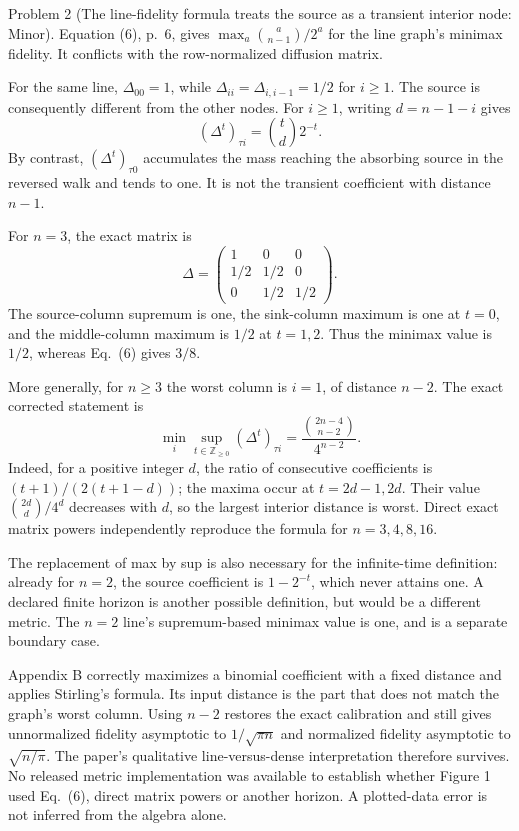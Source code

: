\documentclass[10pt]{article}
\begin{document}
Problem 2 (The line-fidelity formula treats the source as a transient interior node: Minor).  Equation (6), p. 6, gives \(\max_a\binom{a}{n-1}/2^a\) for the line graph’s minimax fidelity. It conflicts with the row-normalized diffusion matrix.\par
For the same line, \(\Delta_{00}=1\), while \(\Delta_{ii}=\Delta_{i,i-1}=1/2\) for \(i\ge1\). The source is consequently different from the other nodes. For \(i\ge1\), writing \(d=n-1-i\) gives \[(\Delta^t)_{\tau i}=\binom td2^{-t}.\] By contrast, \((\Delta^t)_{\tau0}\) accumulates the mass reaching the absorbing source in the reversed walk and tends to one. It is not the transient coefficient with distance \(n-1\).\par
For \(n=3\), the exact matrix is \[\Delta=\begin{pmatrix}1&0&0\\[1pt]1/2&1/2&0\\[1pt]0&1/2&1/2\end{pmatrix}.\] The source-column supremum is one, the sink-column maximum is one at \(t=0\), and the middle-column maximum is \(1/2\) at \(t=1,2\). Thus the minimax value is \(1/2\), whereas Eq. (6) gives \(3/8\).\par
More generally, for \(n\ge3\) the worst column is \(i=1\), of distance \(n-2\). The exact corrected statement is \[\min_i\sup_{t\in\mathbb Z_{\ge0}}(\Delta^t)_{\tau i}
=\frac{\binom{2n-4}{n-2}}{4^{n-2}}.\] Indeed, for a positive integer \(d\), the ratio of consecutive coefficients is \((t+1)/(2(t+1-d))\); the maxima occur at \(t=2d-1,2d\). Their value \(\binom{2d}{d}/4^d\) decreases with \(d\), so the largest interior distance is worst. Direct exact matrix powers independently reproduce the formula for \(n=3,4,8,16\).\par
The replacement of max by sup is also necessary for the infinite-time definition: already for \(n=2\), the source coefficient is \(1-2^{-t}\), which never attains one. A declared finite horizon is another possible definition, but would be a different metric. The \(n=2\) line’s supremum-based minimax value is one, and is a separate boundary case.\par
Appendix B correctly maximizes a binomial coefficient with a fixed distance and applies Stirling’s formula. Its input distance is the part that does not match the graph’s worst column. Using \(n-2\) restores the exact calibration and still gives unnormalized fidelity asymptotic to \(1/\sqrt{\pi n}\) and normalized fidelity asymptotic to \(\sqrt{n/\pi}\). The paper’s qualitative line-versus-dense interpretation therefore survives. No released metric implementation was available to establish whether Figure 1 used Eq. (6), direct matrix powers or another horizon. A plotted-data error is not inferred from the algebra alone.\par
\end{document}
